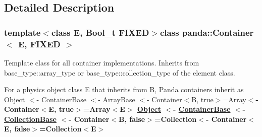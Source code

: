 \subsection{Detailed Description}
\subsubsection*{template$<$class E, Bool\-\_\-t F\-I\-X\-E\-D$>$class panda\-::\-Container$<$ E, F\-I\-X\-E\-D $>$}

Template class for all container implementations. Inherits from base\-\_\-type\-::array\-\_\-type or base\-\_\-type\-::collection\-\_\-type of the element class. 

For a physics object class E that inherits from B, Panda containers inherit as \hyperlink{classpanda_1_1Object}{Object} $<$-\/ \hyperlink{classpanda_1_1ContainerBase}{Container\-Base} $<$-\/ \hyperlink{classpanda_1_1ArrayBase}{Array\-Base} $<$-\/ Container$<$\-B, true$>$=Array{\bfseries  $<$-\/ Container$<$\-E, true$>$=Array$<$\-E$>$ \hyperlink{classpanda_1_1Object}{Object} $<$-\/ \hyperlink{classpanda_1_1ContainerBase}{Container\-Base} $<$-\/ \hyperlink{classpanda_1_1CollectionBase}{Collection\-Base} $<$-\/ Container$<$\-B, false$>$=Collection{\bfseries  $<$-\/ Container$<$\-E, false$>$=Collection$<$\-E$>$ }}

